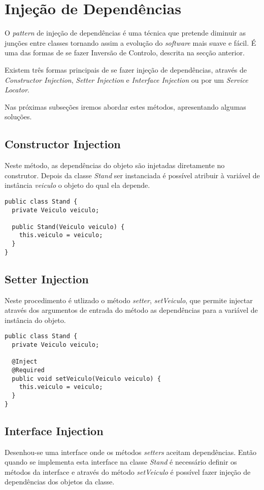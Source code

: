 \section{Injeção de Dependências}

O \textit{pattern} de injeção de dependências é uma técnica que pretende diminuir as junções entre classes tornando assim a evolução do \textit{software} mais suave e fácil. É uma das formas de se fazer Inversão de Controlo, descrita na secção anterior.

Existem três formas principais de se fazer injeção de dependências, através de \textit{Constructor Injection}, \textit{Setter Injection} e \textit{Interface Injection} ou por um \textit{Service Locator}.

Nas próximas subseções iremos abordar estes métodos, apresentando algumas soluções.

\subsection{Constructor Injection}
Neste método, as dependências do objeto são injetadas diretamente no construtor. Depois da classe \textit{Stand} ser instanciada é possível atribuir à variável de instância \textit{veiculo} o objeto do qual ela depende.

\begin{lstlisting}[caption=Injeção pelo Construtor]
public class Stand {
  private Veiculo veiculo;

  public Stand(Veiculo veiculo) {
    this.veiculo = veiculo;
  }
}
\end{lstlisting}

\subsection{Setter Injection}
Neste procedimento é utlizado o método \textit{setter}, \textit{setVeiculo}, que permite injectar através dos argumentos de entrada do método as dependências para a variável de instância do objeto.

\begin{lstlisting}[caption=Injeção pelo Setter]
public class Stand {
  private Veiculo veiculo;

  @Inject
  @Required
  public void setVeiculo(Veiculo veiculo) {
    this.veiculo = veiculo;
  }
}
\end{lstlisting}

\subsection{Interface Injection}
Desenhou-se uma interface onde os métodos \textit{setters} aceitam dependências. Então quando se implementa esta interface na classe \textit{Stand} é necessário definir os métodos da interface e através do método \textit{setVeiculo} é possível fazer injeção de dependências dos objetos da classe.

